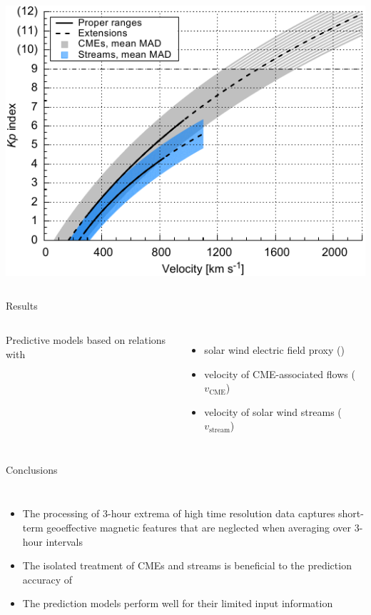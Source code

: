 \documentclass[11pt,aspectratio=1610]{beamer}	%
\newcommand{\captionoftiny}[2]{\captionof{#1}{\color{gray} \tiny #2}}
\begin{document}
\begin{frame}[c]{}{}
	\begin{columns}[c]
		
		\includegraphics[width=\textwidth]{../figures_of_mine/chapter2/Kp_2dhistogram_V_sws123_fit_f3.pdf}


	\end{columns}
\end{frame}

\begin{frame}[c]{Results}{}
	\begin{columns}[c]
	\column{\textwidth}
		
		Predictive \Kp{} models based on relations with
		\begin{itemize}%
			\item solar wind electric field proxy (\vBz{})
			\item velocity of CME-associated flows ($v_\text{CME}$)
			\item velocity of solar wind streams ($v_\text{stream}$)
		\end{itemize}
		
	\end{columns}
\end{frame}
\begin{frame}[c]{Conclusions}{}
	\begin{columns}[c]
	\column{\textwidth}
		
		\begin{itemize}%
			\item The processing of 3-hour extrema of high time resolution data captures short-term geoeffective magnetic features that are neglected when averaging over 3-hour intervals
			\item The isolated treatment of CMEs and streams is beneficial to the prediction accuracy of \Kp{}
			\item The prediction models perform well for their limited input information
		\end{itemize}
		
	\end{columns}
\end{frame}
\end{document}
